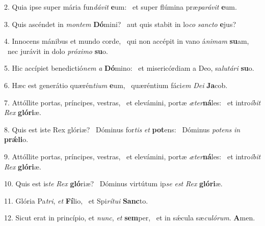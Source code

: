 2. Quia ipse super mária fun\textit{dá}\textit{vit} \textbf{e}um: \ast\  et super flúmina præ\textit{pa}\textit{rá}\textit{vit} \textbf{e}um.\

3. Quis ascéndet in \textit{mon}\textit{tem} \textbf{Dó}mini? \ast\  aut quis stabit in lo\textit{co} \textit{sanc}\textit{to} \textbf{e}jus?\

4. Innocens mánibus et mundo corde, \dag\  qui non accépit in vano á\textit{ni}\textit{mam} \textbf{su}am, \ast\  nec jurávit in dolo \textit{pró}\textit{xi}\textit{mo} \textbf{su}o.\

5. Hic accípiet benedictió\textit{nem} \textit{a} \textbf{Dó}mino: \ast\  et misericórdiam a Deo, sa\textit{lu}\textit{tá}\textit{ri} \textbf{su}o.\

6. Hæc est generátio quærén\textit{ti}\textit{um} \textbf{e}um, \ast\  quæréntium fáci\textit{em} \textit{De}\textit{i} \textbf{Ja}cob.\

7. Attóllite portas, príncipes, vestras, \dag\  et elevámini, portæ \textit{æ}\textit{ter}\textbf{ná}les: \ast\  et intro\textit{í}\textit{bit} \textit{Rex} \textbf{gló}\textbf{ri}æ.\

8. Quis est iste Rex glóriæ? \dag\  Dóminus for\textit{tis} \textit{et} \textbf{pot}ens: \ast\  Dóminus \textit{pot}\textit{ens} \textit{in} \textbf{prǽ}\textbf{li}o.\

9. Attóllite portas, príncipes, vestras, \dag\  et elevámini, portæ \textit{æ}\textit{ter}\textbf{ná}les: \ast\  et intro\textit{í}\textit{bit} \textit{Rex} \textbf{gló}\textbf{ri}æ.\

10. Quis est is\textit{te} \textit{Rex} \textbf{gló}riæ? \ast\  Dóminus virtútum ip\textit{se} \textit{est} \textit{Rex} \textbf{gló}\textbf{ri}æ.\

11. Glória Pa\textit{tri}, \textit{et} \textbf{Fí}lio, \ast\  et Spi\textit{rí}\textit{tu}\textit{i} \textbf{Sanc}to.\

12. Sicut erat in princípio, et \textit{nunc}, \textit{et} \textbf{sem}per, \ast\  et in sǽcula sæ\textit{cu}\textit{ló}\textit{rum}. \textbf{A}men.\

